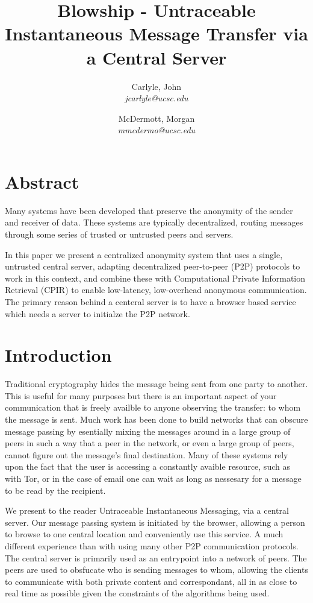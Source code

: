 \documentclass[twocolumn,11pt,english]{article}
\title{Blowship - Untraceable Instantaneous Message Transfer via a Central Server}
\date{}
\author{
  Carlyle, John\\
  \textit{jcarlyle@ucsc.edu}
  \and
  McDermott, Morgan\\
  \textit{mmcdermo@ucsc.edu}
}
\begin{document}
\maketitle

\section*{Abstract} 
Many systems have been developed that preserve the anonymity of the sender and receiver of data. These systems are typically decentralized, routing messages through some series of trusted or untrusted peers and servers. 

In this paper we present a centralized anonymity system that uses a single, untrusted central server, adapting decentralized peer-to-peer (P2P) protocols to work in this context, and combine these with Computational Private Information Retrieval (CPIR) to enable low-latency, low-overhead anonymous communication. The primary reason behind a centeral server is to have a browser based service which needs a server to initialze the P2P network.

\section{Introduction}

Traditional cryptography hides the message being sent from one party to another. This is useful for many purposes but there is an important aspect of your communication that is freely availble to anyone observing the transfer: to whom the message is sent. Much work has been done to build networks that can obscure message passing by esentially mixing the messages around in a large group of peers in such a way that a peer in the network, or even a large group of peers, cannot figure out the message's final destination. Many of these systems rely upon the fact that the user is accessing a constantly avaible resource, such as with Tor\cite{tor-design}, or in the case of email one can wait as long as nessesary for a message to be read by the recipient.

We present to the reader Untraceable Instantaneous Messaging, via a central server. Our message passing system is initiated by the browser, allowing a person to browse to one central location and conveniently use this service. A much different experience than with using many other P2P communication protocols. The central server is primarily used as an entrypoint into a network of peers. The peers are used to obsfucate who is sending messages to whom, allowing the clients to communicate with both private content and correspondant, all in as close to real time as possible given the constraints of the algorithms being used.
\end{document}
